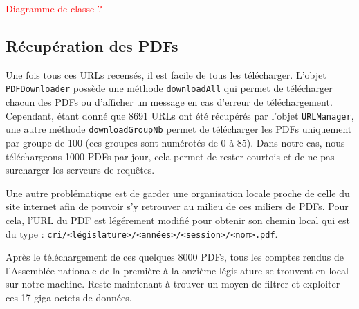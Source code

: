 \textcolor{red}{Diagramme de classe ?}

\subsection{Récupération des PDFs}

Une fois tous ces URLs recensés, il est facile de tous les télécharger. L'objet \verb|PDFDownloader| possède une méthode \verb|downloadAll| qui permet de télécharger chacun des PDFs ou d'afficher un message en cas d'erreur de téléchargement. Cependant, étant donné que 8691 URLs ont été récupérés par l'objet \verb|URLManager|, une autre méthode \verb|downloadGroupNb| permet de télécharger les PDFs uniquement par groupe de 100 (ces groupes sont numérotés de 0 à 85). Dans notre cas, nous téléchargeons 1000 PDFs par jour, cela permet de rester courtois et de ne pas surcharger les serveurs de requêtes.

Une autre problématique est de garder une organisation locale proche de celle du site internet afin de pouvoir s'y retrouver au milieu de ces miliers de PDFs. Pour cela, l'URL du PDF est légérement modifié pour obtenir son chemin local qui est du type : \verb|cri/<législature>/<années>/<session>/<nom>.pdf|.

Après le téléchargement de ces quelques 8000 PDFs, tous les comptes rendus de l'Assemblée nationale de la première à la onzième législature se trouvent en local sur notre machine. Reste maintenant à trouver un moyen de filtrer et exploiter ces 17 giga octets de données.

